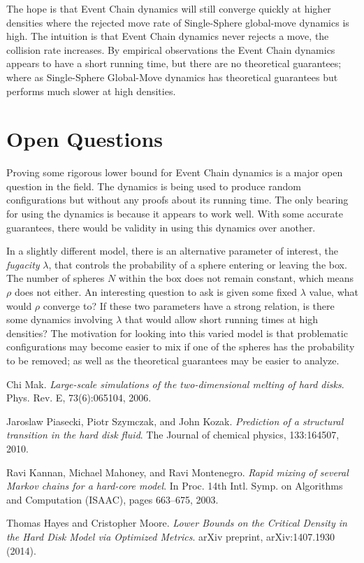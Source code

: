 \documentclass[a4paper,11pt]{article}
\begin{document}
The hope is that Event Chain dynamics will still converge quickly at higher densities where the rejected move rate of Single-Sphere global-move dynamics is high.  The intuition is that Event Chain dynamics never rejects a move, the collision rate increases.  By empirical observations the Event Chain dynamics appears to have a short running time, but there are no theoretical guarantees; where as Single-Sphere Global-Move dynamics has theoretical guarantees but performs much slower at high densities.

\section*{Open Questions}

Proving some rigorous lower bound for Event Chain dynamics is a major open question in the field.  The dynamics is being used to produce random configurations but without any proofs about its running time.  The only bearing for using the dynamics is because it appears to work well.  With some accurate guarantees, there would be validity in using this dynamics over another.

In a slightly different model, there is an alternative parameter of interest, the \textit{fugacity} $\lambda$, that controls the probability of a sphere entering or leaving the box. The number of spheres $N$ within the box does not remain constant, which means $\rho$ does not either.  An interesting question to ask is given some fixed $\lambda$ value, what would $\rho$ converge to?  If these two parameters have a strong relation, is there some dynamics involving $\lambda$ that would allow short running times at high densities?  The motivation for looking into this varied model is that problematic configurations may become easier to mix if one of the spheres has the probability to be removed; as well as the theoretical guarantees may be easier to analyze.

\begin{thebibliography}{9}


  Chi Mak. 
  \emph{Large-scale simulations of the two-dimensional melting of hard disks}.
  Phys. Rev. E,
  73(6):065104, 2006.

  Jaroslaw Piasecki, Piotr Szymczak, and John Kozak.
  \emph{Prediction of a structural transition in the hard disk fluid}.
  The Journal of chemical physics,
  133:164507, 2010.

  Ravi Kannan, Michael Mahoney, and Ravi Montenegro.
  \emph{Rapid mixing of several Markov chains for a hard-core model}.
  In Proc. 14th Intl. Symp. on Algorithms and Computation (ISAAC),
  pages 663–675, 2003.

  Thomas Hayes and Cristopher Moore.
  \emph{Lower Bounds on the Critical Density in the Hard Disk Model via Optimized Metrics}.
  arXiv preprint,
  arXiv:1407.1930 (2014).

\end{thebibliography}
\end{document}
